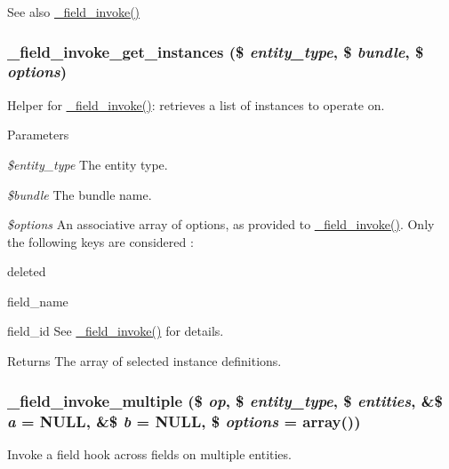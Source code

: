 \begin{DoxySeeAlso}{See also}
\hyperlink{group__field__attach_ga65f891a5eea6513f8505f5cfc5894896}{\_\-field\_\-invoke()} 
\end{DoxySeeAlso}
\hypertarget{group__field__attach_gac6a9d83062a9c3703f659bb2ccef3d76}{
\subsubsection[{\_\-field\_\-invoke\_\-get\_\-instances}]{\setlength{\rightskip}{0pt plus 5cm}\_\-field\_\-invoke\_\-get\_\-instances (\$ {\em entity\_\-type}, \/  \$ {\em bundle}, \/  \$ {\em options})}}
\label{group__field__attach_gac6a9d83062a9c3703f659bb2ccef3d76}
Helper for \hyperlink{group__field__attach_ga65f891a5eea6513f8505f5cfc5894896}{\_\-field\_\-invoke()}: retrieves a list of instances to operate on.


\begin{DoxyParams}{Parameters}
\item[{\em \$entity\_\-type}]The entity type. \item[{\em \$bundle}]The bundle name. \item[{\em \$options}]An associative array of options, as provided to \hyperlink{group__field__attach_ga65f891a5eea6513f8505f5cfc5894896}{\_\-field\_\-invoke()}. Only the following keys are considered :
\begin{DoxyItemize}
\item deleted
\item field\_\-name
\item field\_\-id See \hyperlink{group__field__attach_ga65f891a5eea6513f8505f5cfc5894896}{\_\-field\_\-invoke()} for details.
\end{DoxyItemize}\end{DoxyParams}
\begin{DoxyReturn}{Returns}
The array of selected instance definitions. 
\end{DoxyReturn}
\hypertarget{group__field__attach_ga791aeba11e29038daf3e798dbea0df60}{
\subsubsection[{\_\-field\_\-invoke\_\-multiple}]{\setlength{\rightskip}{0pt plus 5cm}\_\-field\_\-invoke\_\-multiple (\$ {\em op}, \/  \$ {\em entity\_\-type}, \/  \$ {\em entities}, \/  \&\$ {\em a} = {\ttfamily NULL}, \/  \&\$ {\em b} = {\ttfamily NULL}, \/  \$ {\em options} = {\ttfamily array()})}}
\label{group__field__attach_ga791aeba11e29038daf3e798dbea0df60}
Invoke a field hook across fields on multiple entities.



